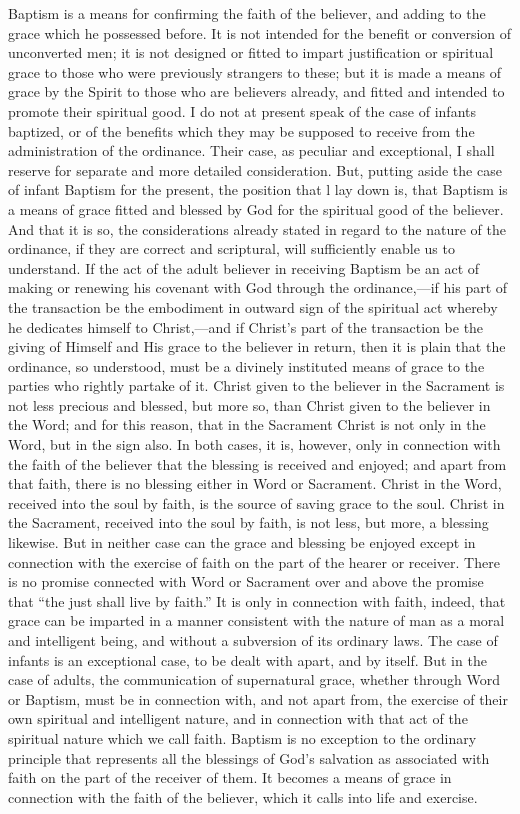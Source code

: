 \documentclass[]{book}
\begin{document}
Baptism is a means for confirming the faith of the believer, and adding to the grace which he possessed before. It is not intended for the benefit or conversion of unconverted men; it is not designed or fitted to impart justification or spiritual grace to those who were previously strangers to these; but it is made a means of grace by the Spirit to those who are believers already, and fitted and intended to promote their spiritual good. I do not at present speak of the case of infants baptized, or of the benefits which they may be supposed to receive from the administration of the ordinance. Their case, as peculiar and exceptional, I shall reserve for separate and more detailed consideration. But, putting aside the case of infant Baptism for the present, the position that l lay down is, that Baptism is a means of grace fitted and blessed by God for the spiritual good of the believer. And that it is so, the considerations already stated in regard to the nature of the ordinance, if they are correct and scriptural, will sufficiently enable us to understand. If the act of the adult believer in receiving Baptism be an act of making or renewing his covenant with God through the ordinance,---if his part of the transaction be the embodiment in outward sign of the spiritual act whereby he dedicates himself to Christ,---and if Christ's part of the transaction be the giving of Himself and His grace to the believer in return, then it is plain that the ordinance, so understood, must be a divinely instituted means of grace to the parties who rightly partake of it. Christ given to the believer in the Sacrament is not less precious and blessed, but more so, than Christ given to the believer in the Word; and for this reason, that in the Sacrament Christ is not only in the Word, but in the sign also. In both cases, it is, however, only in connection with the faith of the believer that the blessing is received and enjoyed; and apart from that faith, there is no blessing either in Word or Sacrament. Christ in the Word, received into the soul by faith, is the source of saving grace to the soul. Christ in the Sacrament, received into the soul by faith, is not less, but more, a blessing likewise. But in neither case can the grace and blessing be enjoyed except in connection with the exercise of faith on the part of the hearer or receiver. There is no promise connected with Word or Sacrament over and above the promise that ``the just shall live by faith.'' It is only in connection with faith, indeed, that grace can be imparted in a manner consistent with the nature of man as a moral and intelligent being, and without a subversion of its ordinary laws. The case of infants is an exceptional case, to be dealt with apart, and by itself. But in the case of adults, the communication of supernatural grace, whether through Word or Baptism, must be in connection with, and not apart from, the exercise of their own spiritual and intelligent nature, and in connection with that act of the spiritual nature which we call faith. Baptism is no exception to the ordinary principle that represents all the blessings of God's salvation as associated with faith on the part of the receiver of them. It becomes a means of grace in connection with the faith of the believer, which it calls into life and exercise.
\end{document}
